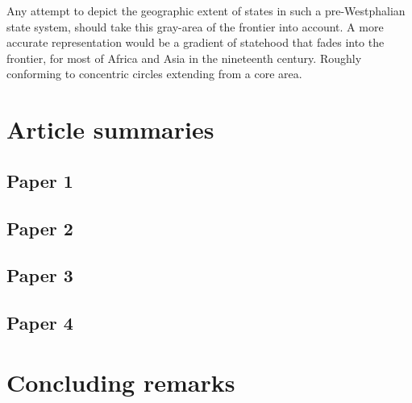 Any attempt to depict the geographic extent of states in such a pre-Westphalian
state system, should take this gray-area of the frontier into account. A more
accurate representation would be a gradient of statehood that fades into the
frontier, for most of Africa and Asia in the nineteenth century. Roughly
conforming to concentric circles extending from a core area. 

\section{Article summaries} \label{Article summaries}

\subsection{Paper 1} \label{Paper 1}

\subsection{Paper 2} \label{Paper 2}

\subsection{Paper 3} \label{Paper 3}

\subsection{Paper 4} \label{Paper 4}

\section{Concluding remarks} \label{Concluding remarks}

\clearpage




